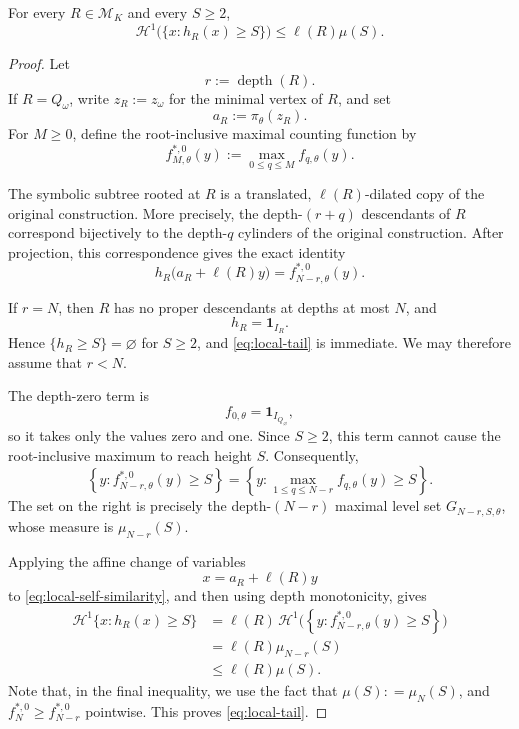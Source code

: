 \documentclass[12pt]{amsart}
\numberwithin{equation}{section}
\begin{document}
\begin{lemma}\label{lem:local-tail}
For every $R\in\mathscr M_K$ and every $S\geq2$,
\begin{equation}\label{eq:local-tail}
 \mathcal H^1\bigl(\{x:h_R(x)\geq S\}\bigr)
 \leq \ell(R)\mu(S).
\end{equation}
\end{lemma}

\begin{proof}
Let
\[
 r:=\operatorname{depth}(R).
\]
If $R=Q_\omega$, write $z_R:=z_\omega$ for the minimal vertex of $R$,
and set
\[
 a_R:=\pi_\theta(z_R).
\]
For $M\geq0$, define the root-inclusive maximal counting function by
\[
 f_{M,\theta}^{*,0}(y)
 :=
 \max_{0\leq q\leq M}f_{q,\theta}(y).
\]

The symbolic subtree rooted at $R$ is a translated,
$\ell(R)$-dilated copy of the original construction.  More precisely, the
depth-$(r+q)$ descendants of $R$ correspond bijectively to the depth-$q$
cylinders of the original construction.  After projection, this
correspondence gives the exact identity
\begin{equation}\label{eq:local-self-similarity}
 h_R\bigl(a_R+\ell(R)y\bigr)
 =
 f_{N-r,\theta}^{*,0}(y).
\end{equation}

If $r=N$, then $R$ has no proper descendants at depths at most $N$, and
\[
 h_R=\mathbf 1_{I_R}.
\]
Hence $\{h_R\geq S\}=\varnothing$ for $S\geq2$, and
\eqref{eq:local-tail} is immediate.  We may therefore assume that $r<N$.

The depth-zero term is
\[
 f_{0,\theta}=\mathbf 1_{I_{Q_\varnothing}},
\]
so it takes only the values zero and one.  Since $S\geq2$, this term cannot
cause the root-inclusive maximum to reach height $S$.  Consequently,
\[
 \left\{
 y:f_{N-r,\theta}^{*,0}(y)\geq S
 \right\}
 =
 \left\{
 y:\max_{1\leq q\leq N-r}f_{q,\theta}(y)\geq S
 \right\}.
\]
The set on the right is precisely the depth-$(N-r)$ maximal level set
$G_{N-r,S,\theta}$, whose measure is $\mu_{N-r}(S)$.

Applying the affine change of variables
\[
 x=a_R+\ell(R)y
\]
to \eqref{eq:local-self-similarity}, and then using depth monotonicity, gives
\[
 \begin{aligned}
 \mathcal H^1\{x:h_R(x)\geq S\}
 &=
 \ell(R)\,
 \mathcal H^1
 \big(\left\{
 y:f_{N-r,\theta}^{*,0}(y)\geq S
 \right\} \big)\\[1ex]
 &=
 \ell(R)\mu_{N-r}(S)\\[1ex]
 &\leq
 \ell(R)\mu(S).
 \end{aligned}
\]
Note that, in the final inequality, we use the fact that $\mu (S) : = \mu_N (S)$, and $f_{N}^{*,0} \geq f_{N-r}^{*,0}$ pointwise. This proves \eqref{eq:local-tail}.
\end{proof}
\end{document}
